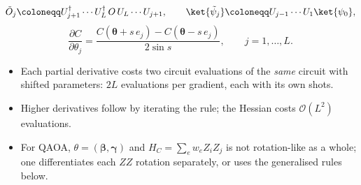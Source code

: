 \documentclass[handoutsbeamer.tex]{subfiles}
\begin{document}
\begin{frame}
\begin{equation}
    \tilde O_j \coloneqq U_{j+1}^\dagger\cdots U_L^\dagger\,O\,U_L\cdots U_{j+1},\qquad \ket{\tilde\psi_j} \coloneqq U_{j-1}\cdots U_1\ket{\psi_0},
\end{equation}
\begin{equation}\label{eq:ch07:grad}
    \frac{\partial C}{\partial\theta_j} = \frac{C(\boldsymbol\theta + s\,e_j) - C(\boldsymbol\theta - s\,e_j)}{2\sin s},\qquad j = 1,\dots,L.
\end{equation}
\begin{itemize}\setlength\itemsep{0.2em}
    \item Each partial derivative costs two circuit evaluations of the \emph{same} circuit with shifted parameters: $2L$ evaluations per gradient, each with its own shots.
    \item Higher derivatives follow by iterating the rule; the Hessian costs $\mathcal O(L^2)$ evaluations.
    \item For QAOA, $\theta = (\boldsymbol\beta,\boldsymbol\gamma)$ and $H_C = \sum_e w_eZ_iZ_j$ is not rotation-like as a whole; one differentiates each $ZZ$ rotation separately, or uses the generalised rules below.
\end{itemize}
\end{frame}
\end{document}
